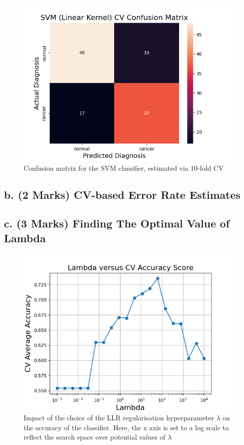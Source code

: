 \documentclass[twocolumn]{article}
\begin{document}
\begin{figure}[H]
    \centering
    \includegraphics[width=\linewidth]{figures/SVM_(Linear_Kernel)_CV_Confusion_Matrix.png}
    \caption{Confusion matrix for the SVM classifier, estimated via 10-fold CV}
    \label{fig:cm-svm}
\end{figure}

\subsection{b. (2 Marks) CV-based Error Rate Estimates}

\subsection{c. (3 Marks) Finding The Optimal Value of Lambda}

\begin{figure}[H]
    \centering
    \includegraphics[width=\linewidth]{figures/Lambda_versus_CV_Accuracy_Score.png}
    \caption{Impact of the choice of the LLR regularisation hyperparameter $\lambda$ on the accuracy of the classifier. Here, the x axis is set to a log scale to reflect the search space over potential values of $\lambda$}
    \label{fig:lambda-search}
\end{figure}
\end{document}
